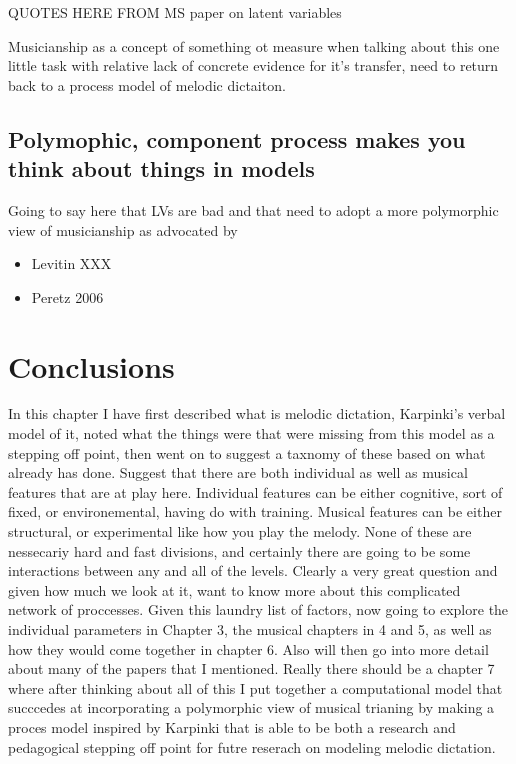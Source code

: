 \documentclass[]{book}
\providecommand{\tightlist}{%
  \setlength{\itemsep}{0pt}\setlength{\parskip}{0pt}}
\theoremstyle{definition}
\theoremstyle{definition}
\theoremstyle{definition}
\theoremstyle{remark}
\begin{document}
QUOTES HERE FROM MS paper on latent variables

Musicianship as a concept of something ot measure when talking about
this one little task with relative lack of concrete evidence for it's
transfer, need to return back to a process model of melodic dictaiton.

\hypertarget{polymophic-component-process-makes-you-think-about-things-in-models}{%
\subsection{Polymophic, component process makes you think about things
in
models}\label{polymophic-component-process-makes-you-think-about-things-in-models}}

Going to say here that LVs are bad and that need to adopt a more
polymorphic view of musicianship as advocated by

\begin{itemize}
\tightlist
\item
  Levitin XXX
\item
  Peretz 2006
\end{itemize}

\hypertarget{conclusions}{%
\section{Conclusions}\label{conclusions}}

In this chapter I have first described what is melodic dictation,
Karpinki's verbal model of it, noted what the things were that were
missing from this model as a stepping off point, then went on to suggest
a taxnomy of these based on what already has done. Suggest that there
are both individual as well as musical features that are at play here.
Individual features can be either cognitive, sort of fixed, or
environemental, having do with training. Musical features can be either
structural, or experimental like how you play the melody. None of these
are nessecariy hard and fast divisions, and certainly there are going to
be some interactions between any and all of the levels. Clearly a very
great question and given how much we look at it, want to know more about
this complicated network of proccesses. Given this laundry list of
factors, now going to explore the individual parameters in Chapter 3,
the musical chapters in 4 and 5, as well as how they would come together
in chapter 6. Also will then go into more detail about many of the
papers that I mentioned. Really there should be a chapter 7 where after
thinking about all of this I put together a computational model that
succcedes at incorporating a polymorphic view of musical trianing by
making a proces model inspired by Karpinki that is able to be both a
research and pedagogical stepping off point for futre reserach on
modeling melodic dictation.
\end{document}
